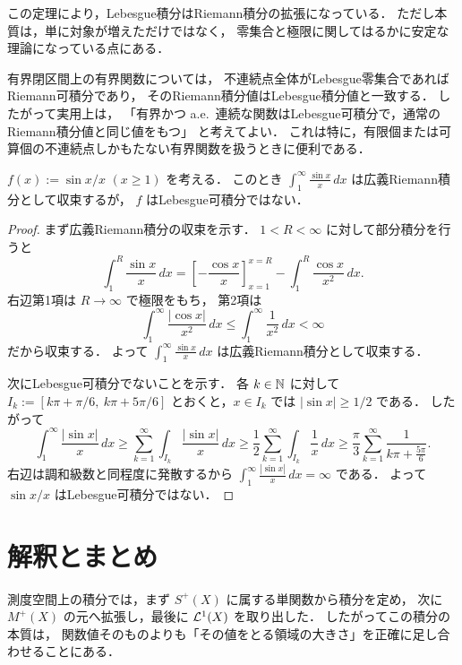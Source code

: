 \begin{remark}
この定理により，Lebesgue積分はRiemann積分の拡張になっている．
ただし本質は，単に対象が増えただけではなく，
零集合と極限に関してはるかに安定な理論になっている点にある．
\end{remark}

\begin{remark}[不連続点集合による十分条件]
有界閉区間上の有界関数については，
不連続点全体がLebesgue零集合であればRiemann可積分であり，
そのRiemann積分値はLebesgue積分値と一致する．
したがって実用上は，
「有界かつ a.e.\ 連続な関数はLebesgue可積分で，通常のRiemann積分値と同じ値をもつ」
と考えてよい．
これは特に，有限個または可算個の不連続点しかもたない有界関数を扱うときに便利である．
\end{remark}

\begin{example}[広義Riemann積分可能だがLebesgue積分可能でない関数]
$f(x):=\sin x/x$ $(x \ge 1)$ を考える．
このとき $\int_1^{\infty} \frac{\sin x}{x}\,dx$ は広義Riemann積分として収束するが，
$f$ はLebesgue可積分ではない．
\end{example}
\begin{proof}
まず広義Riemann積分の収束を示す．
$1<R<\infty$ に対して部分積分を行うと
\[
\int_1^R \frac{\sin x}{x}\,dx
=\left[-\frac{\cos x}{x}\right]_{x=1}^{x=R}
-\int_1^R \frac{\cos x}{x^2}\,dx.
\]
右辺第1項は $R\to\infty$ で極限をもち，
第2項は
\[
\int_1^{\infty}\frac{|\cos x|}{x^2}\,dx
\le \int_1^{\infty}\frac{1}{x^2}\,dx
<\infty
\]
だから収束する．
よって $\int_1^{\infty} \frac{\sin x}{x}\,dx$ は広義Riemann積分として収束する．

次にLebesgue可積分でないことを示す．
各 $k \in \mathbb N$ に対して
$I_k:=[k\pi+\pi/6,\ k\pi+5\pi/6]$ とおくと，$x \in I_k$ では $|\sin x|\ge 1/2$ である．
したがって
\[
\int_1^{\infty}\frac{|\sin x|}{x}\,dx
\ge \sum_{k=1}^{\infty}\int_{I_k}\frac{|\sin x|}{x}\,dx
\ge \frac12\sum_{k=1}^{\infty}\int_{I_k}\frac{1}{x}\,dx
\ge \frac{\pi}{3}\sum_{k=1}^{\infty}\frac{1}{k\pi+\frac{5\pi}{6}}.
\]
右辺は調和級数と同程度に発散するから
$\int_1^{\infty}\frac{|\sin x|}{x}\,dx=\infty$ である．
よって $\sin x/x$ はLebesgue可積分ではない．
\end{proof}

\section{解釈とまとめ}

測度空間上の積分では，まず $S^+(X)$ に属する単関数から積分を定め，
次に $M^+(X)$ の元へ拡張し，最後に $\mathcal L^1(X)$ を取り出した．
したがってこの積分の本質は，
関数値そのものよりも「その値をとる領域の大きさ」を正確に足し合わせることにある．

